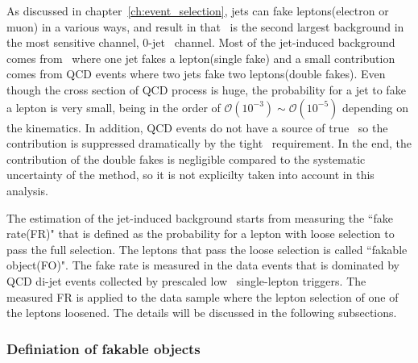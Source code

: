 As discussed in chapter~\ref{ch:event_selection}, 
jets can fake leptons(electron or muon) in a various ways, 
and result in that \Wjets\ is the second largest background in the most 
sensitive channel, 0-jet \DF\ channel. 
Most of the jet-induced background comes from \Wjets\ where one jet fakes a lepton(single fake)
and a small contribution comes from QCD events where two jets fake two leptons(double fakes).  
Even though the cross section of QCD process is huge, the probability for a jet 
to fake a lepton is very small, being in the order of 
$\mathcal{O}(10^{-3}) \sim \mathcal{O}(10^{-5})$
depending on the kinematics. In addition, QCD events do not have a source of true \met\, 
so the contribution is suppressed dramatically by the tight \met\ requirement. 
In the end, the contribution of the double fakes is negligible compared to the 
systematic uncertainty of the method, so it is not explicilty taken into account in this analysis. 

The estimation of the jet-induced background starts from measuring the ``fake rate(FR)"
that is defined as the probability for a lepton with loose selection to pass the full selection. 
The leptons that pass the loose selection is called ``fakable object(FO)". The fake rate is 
measured in the data events that is dominated by QCD di-jet events collected 
by prescaled low \pt\ single-lepton triggers. 
The measured FR is applied to the data sample where the lepton selection 
of one of the leptons loosened. The details will be discussed in the following subsections.

\subsubsection{Definiation of fakable objects}

